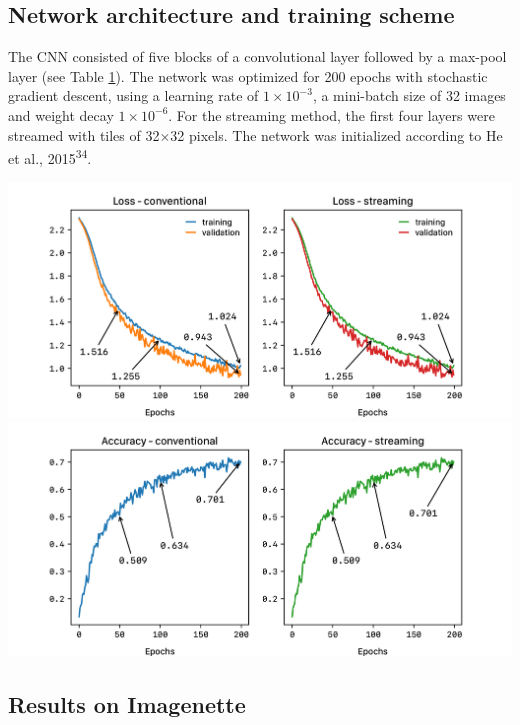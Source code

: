\documentclass[
  12pt,
  a5,margin=2cmpaper,
]{article}
\begin{document}
\hypertarget{network-architecture-and-training-scheme}{%
\subsection{Network architecture and training
scheme}\label{network-architecture-and-training-scheme}}

The CNN consisted of five blocks of a convolutional layer followed by a
max-pool layer (see Table \protect\hyperlink{tab:imagenetnet}{1}). The
network was optimized for 200 epochs with stochastic gradient descent,
using a learning rate of \(1 \times 10^{-3}\), a mini-batch size of 32
images and weight decay \(1 \times 10^{-6}\). For the streaming method,
the first four layers were streamed with tiles of 32\(\times\)32 pixels.
The network was initialized according to He et al.,
2015\textsuperscript{34}.

\includegraphics{chpt2_imgs/streamingvsnormal_rebuttal.png}\\
\includegraphics{chpt2_imgs/streamingvsnormal_accuracy_rebuttal.png}

\hypertarget{results-on-imagenette}{%
\subsection{Results on Imagenette}\label{results-on-imagenette}}
\end{document}
